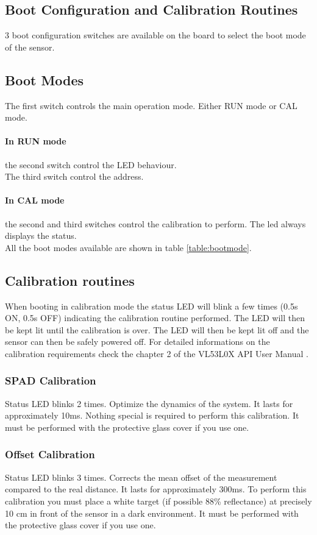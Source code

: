 \begin{multicols}{2}
\section{Boot Configuration and Calibration Routines}
3 boot configuration switches are available on the board to select the boot mode of the sensor.
\subsection{Boot Modes} \label{sec:BootModes}
The first switch controls the main operation mode. Either RUN mode or CAL mode.
\paragraph{In RUN mode} the second switch control the LED behaviour.\\
The third switch control the \iic address.
\paragraph{In CAL mode} the second and third switches control the calibration to perform. The led always displays the status.\\
All the boot modes available are shown in table \ref{table:bootmode}.

\subsection{Calibration routines}
When booting in calibration mode the status LED will blink a few times (0.5s ON, 0.5s OFF) indicating the calibration routine performed. The LED will then be kept lit until the calibration is over. The LED will then be kept lit off and the sensor can then be safely powered off. For detailed informations on the calibration requirements check the chapter 2 of the VL53L0X API User Manual \cite{tofAPI}.

\subsubsection{SPAD Calibration}
Status LED blinks 2 times. Optimize the dynamics of the system. It lasts for approximately 10ms. Nothing special is required to perform this calibration. It must be performed with the protective glass cover if you use one.

\subsubsection{Offset Calibration}
Status LED blinks 3 times. Corrects the mean offset of the measurement compared to the real distance. It lasts for approximately 300ms. To perform this calibration you must place a white target (if possible 88\% reflectance) at precisely 10 cm in front of the sensor in a dark environment. It must be performed with the protective glass cover if you use one.


\end{multicols}
